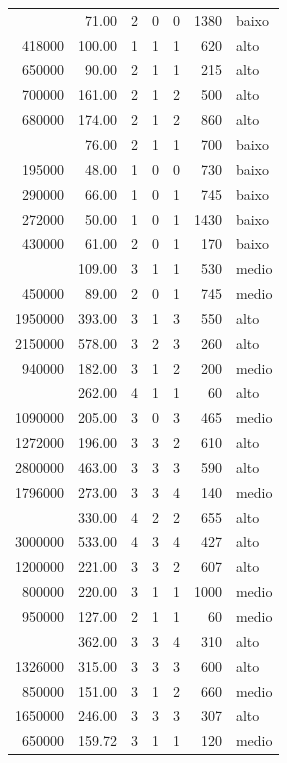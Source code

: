 \documentclass[a4paper]{article}
\begin{document}
\begin{table}[H]
\begin{tabular}{rrrrrrl}
\addlinespace
270000 & 71.00 & 2 & 0 & 0 & 1380 & baixo\\
418000 & 100.00 & 1 & 1 & 1 & 620 & alto\\
650000 & 90.00 & 2 & 1 & 1 & 215 & alto\\
700000 & 161.00 & 2 & 1 & 2 & 500 & alto\\
680000 & 174.00 & 2 & 1 & 2 & 860 & alto\\
\addlinespace
420000 & 76.00 & 2 & 1 & 1 & 700 & baixo\\
195000 & 48.00 & 1 & 0 & 0 & 730 & baixo\\
290000 & 66.00 & 1 & 0 & 1 & 745 & baixo\\
272000 & 50.00 & 1 & 0 & 1 & 1430 & baixo\\
430000 & 61.00 & 2 & 0 & 1 & 170 & baixo\\
\addlinespace
895000 & 109.00 & 3 & 1 & 1 & 530 & medio\\
450000 & 89.00 & 2 & 0 & 1 & 745 & medio\\
1950000 & 393.00 & 3 & 1 & 3 & 550 & alto\\
2150000 & 578.00 & 3 & 2 & 3 & 260 & alto\\
940000 & 182.00 & 3 & 1 & 2 & 200 & medio\\
\addlinespace
1400000 & 262.00 & 4 & 1 & 1 & 60 & alto\\
1090000 & 205.00 & 3 & 0 & 3 & 465 & medio\\
1272000 & 196.00 & 3 & 3 & 2 & 610 & alto\\
2800000 & 463.00 & 3 & 3 & 3 & 590 & alto\\
1796000 & 273.00 & 3 & 3 & 4 & 140 & medio\\
\addlinespace
1400000 & 330.00 & 4 & 2 & 2 & 655 & alto\\
3000000 & 533.00 & 4 & 3 & 4 & 427 & alto\\
1200000 & 221.00 & 3 & 3 & 2 & 607 & alto\\
800000 & 220.00 & 3 & 1 & 1 & 1000 & medio\\
950000 & 127.00 & 2 & 1 & 1 & 60 & medio\\
\addlinespace
2061000 & 362.00 & 3 & 3 & 4 & 310 & alto\\
1326000 & 315.00 & 3 & 3 & 3 & 600 & alto\\
850000 & 151.00 & 3 & 1 & 2 & 660 & medio\\
1650000 & 246.00 & 3 & 3 & 3 & 307 & alto\\
650000 & 159.72 & 3 & 1 & 1 & 120 & medio\\
\bottomrule
\end{tabular}
\end{table}
\end{document}
